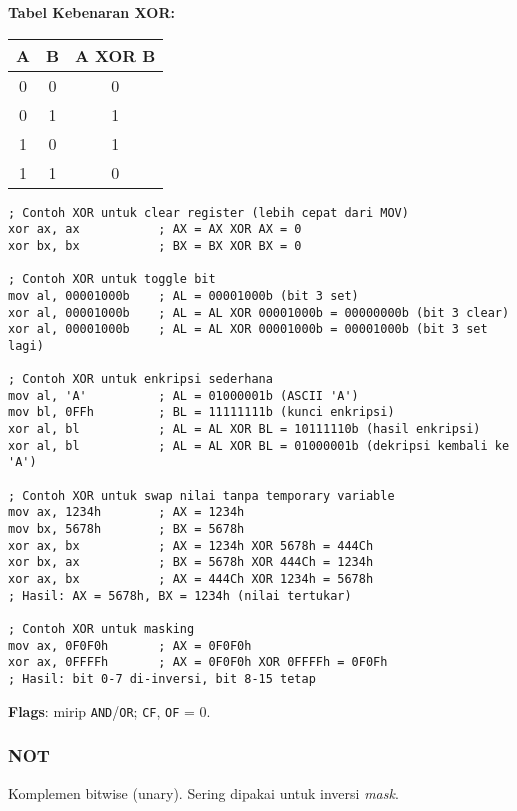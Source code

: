 \documentclass[../main.tex]{subfiles}
\begin{document}
\textbf{Tabel Kebenaran XOR:}
\begin{center}
    \begin{tabular}{|c|c|c|}
        \hline
        A & B & A XOR B \\
        \hline
        0 & 0 & 0 \\
        0 & 1 & 1 \\
        1 & 0 & 1 \\
        1 & 1 & 0 \\
        \hline
    \end{tabular}
\end{center}

\begin{lstlisting}[language={[x86masm]Assembler}, caption=Instruksi XOR, label={lst:xor-examples}]
; Contoh XOR untuk clear register (lebih cepat dari MOV)
xor ax, ax           ; AX = AX XOR AX = 0
xor bx, bx           ; BX = BX XOR BX = 0

; Contoh XOR untuk toggle bit
mov al, 00001000b    ; AL = 00001000b (bit 3 set)
xor al, 00001000b    ; AL = AL XOR 00001000b = 00000000b (bit 3 clear)
xor al, 00001000b    ; AL = AL XOR 00001000b = 00001000b (bit 3 set lagi)

; Contoh XOR untuk enkripsi sederhana
mov al, 'A'          ; AL = 01000001b (ASCII 'A')
mov bl, 0FFh         ; BL = 11111111b (kunci enkripsi)
xor al, bl           ; AL = AL XOR BL = 10111110b (hasil enkripsi)
xor al, bl           ; AL = AL XOR BL = 01000001b (dekripsi kembali ke 'A')

; Contoh XOR untuk swap nilai tanpa temporary variable
mov ax, 1234h        ; AX = 1234h
mov bx, 5678h        ; BX = 5678h
xor ax, bx           ; AX = 1234h XOR 5678h = 444Ch
xor bx, ax           ; BX = 5678h XOR 444Ch = 1234h
xor ax, bx           ; AX = 444Ch XOR 1234h = 5678h
; Hasil: AX = 5678h, BX = 1234h (nilai tertukar)

; Contoh XOR untuk masking
mov ax, 0F0F0h       ; AX = 0F0F0h
xor ax, 0FFFFh       ; AX = 0F0F0h XOR 0FFFFh = 0F0Fh
; Hasil: bit 0-7 di-inversi, bit 8-15 tetap
\end{lstlisting}

\textbf{Flags}: mirip \texttt{AND}/\texttt{OR}; \texttt{CF}, \texttt{OF} = 0.

            \subsubsection{NOT}
Komplemen bitwise (unary). Sering dipakai untuk inversi \textit{mask}.
\end{document}
